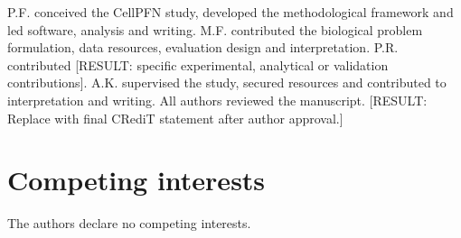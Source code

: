 \documentclass[12pt]{article}
\newcommand{\resultplaceholder}[1]{\textcolor{red!75!black}{[RESULT: #1]}}
\begin{document}
P.F. conceived the CellPFN study, developed the methodological framework and led software, analysis and writing. M.F. contributed the biological problem formulation, data resources, evaluation design and interpretation. P.R. contributed \resultplaceholder{specific experimental, analytical or validation contributions}. A.K. supervised the study, secured resources and contributed to interpretation and writing. All authors reviewed the manuscript. \resultplaceholder{Replace with final CRediT statement after author approval.}

\section*{Competing interests}

The authors declare no competing interests.
\end{document}
